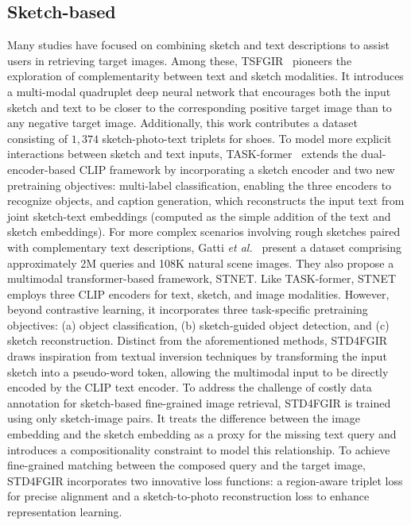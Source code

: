 \subsection{Sketch-based} 
Many studies have focused on combining sketch and text descriptions to assist users in retrieving target images. Among these, TSFGIR~\cite{tsfgir} pioneers the exploration of complementarity between text and sketch modalities. It introduces a multi-modal quadruplet deep neural network that encourages both the input sketch and text to be closer to the corresponding positive target image than to any negative target image. Additionally, this work contributes a dataset consisting of $1,374$ sketch-photo-text triplets for shoes.
To model more explicit interactions between sketch and text inputs, TASK-former~\cite{taskformer} extends the dual-encoder-based CLIP framework by incorporating a sketch encoder and two new pretraining objectives: multi-label classification, enabling the three encoders to recognize objects, and caption generation, which reconstructs the input text from joint sketch-text embeddings (computed as the simple addition of the text and sketch embeddings). For more complex scenarios involving rough sketches paired with complementary text descriptions, Gatti \textit{et al.}~\cite{stnet} present a dataset comprising approximately 2M queries and 108K natural scene images. They also propose a multimodal transformer-based framework, STNET. Like TASK-former, STNET employs three CLIP encoders for text, sketch, and image modalities. However, beyond contrastive learning, it incorporates three task-specific pretraining objectives: (a) object classification, (b) sketch-guided object detection, and (c) sketch reconstruction.
Distinct from the aforementioned methods, STD4FGIR~\cite{STD4FGIR} draws inspiration from textual inversion techniques by transforming the input sketch into a pseudo-word token, allowing the multimodal input to be directly encoded by the CLIP text encoder. To address the challenge of costly data annotation for sketch-based fine-grained image retrieval, STD4FGIR is trained using only sketch-image pairs. It treats the difference between the image embedding and the sketch embedding as a proxy for the missing text query and introduces a compositionality constraint to model this relationship. To achieve fine-grained matching between the composed query and the target image, STD4FGIR incorporates two innovative loss functions: a region-aware triplet loss for precise alignment and a sketch-to-photo reconstruction loss to enhance representation learning.
